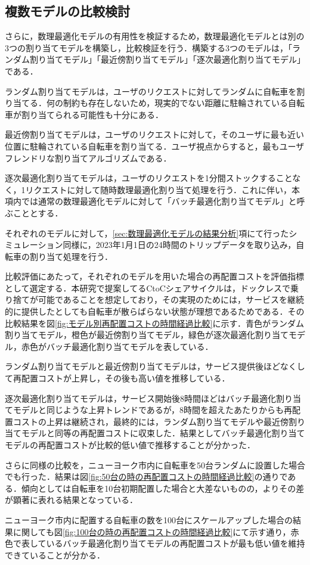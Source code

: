           
      \subsection{複数モデルの比較検討}
        \label{sec:複数モデルの比較検討}
          \par さらに，数理最適化モデルの有用性を検証するため，数理最適化モデルとは別の3つの割り当てモデルを構築し，比較検証を行う．構築する3つのモデルは，「ランダム割り当てモデル」「最近傍割り当てモデル」「逐次最適化割り当てモデル」である．
          \par ランダム割り当てモデルは，ユーザのリクエストに対してランダムに自転車を割り当てる．何の制約も存在しないため，現実的でない距離に駐輪されている自転車が割り当てられる可能性も十分にある．
          \par 最近傍割り当てモデルは，ユーザのリクエストに対して，そのユーザに最も近い位置に駐輪されている自転車を割り当てる．ユーザ視点からすると，最もユーザフレンドリな割り当てアルゴリズムである．
          \par 逐次最適化割り当てモデルは，ユーザのリクエストを1分間ストックすることなく，1リクエストに対して随時数理最適化割り当て処理を行う．これに伴い，本項内では通常の数理最適化モデルに対して「バッチ最適化割り当てモデル」と呼ぶこととする．
          \par それぞれのモデルに対して，\ref{sec:数理最適化モデルの結果分析}項にて行ったシミュレーション同様に，2023年1月1日の24時間のトリップデータを取り込み，自転車の割り当て処理を行う．
          \par 比較評価にあたって，それぞれのモデルを用いた場合の再配置コストを評価指標として選定する．本研究で提案してるCtoCシェアサイクルは，ドックレスで乗り捨てが可能であることを想定しており，その実現のためには，サービスを継続的に提供したとしても自転車が散らばらない状態が理想であるためである．その比較結果を図\ref{fig:モデル別再配置コストの時間経過比較}に示す．青色がランダム割り当てモデル，橙色が最近傍割り当てモデル，緑色が逐次最適化割り当てモデル，赤色がバッチ最適化割り当てモデルを表している．
          \par ランダム割り当てモデルと最近傍割り当てモデルは，サービス提供後ほどなくして再配置コストが上昇し，その後も高い値を推移している．
          \par 逐次最適化割り当てモデルは，サービス開始後8時間ほどはバッチ最適化割り当てモデルと同じような上昇トレンドであるが，8時間を超えたあたりからも再配置コストの上昇は継続され，最終的には，ランダム割り当てモデルや最近傍割り当てモデルと同等の再配置コストに収束した．結果としてバッチ最適化割り当てモデルの再配置コストが比較的低い値で推移することが分かった．
          \par さらに同様の比較を，ニューヨーク市内に自転車を50台ランダムに設置した場合でも行った．結果は図\ref{fig:50台の時の再配置コストの時間経過比較}の通りである．傾向としては自転車を10台初期配置した場合と大差ないものの，よりその差が顕著に表れる結果となっている．
          \par ニューヨーク市内に配置する自転車の数を100台にスケールアップした場合の結果に関しても図\ref{fig:100台の時の再配置コストの時間経過比較}にて示す通り，赤色で表しているバッチ最適化割り当てモデルの再配置コストが最も低い値を維持できていることが分かる．

